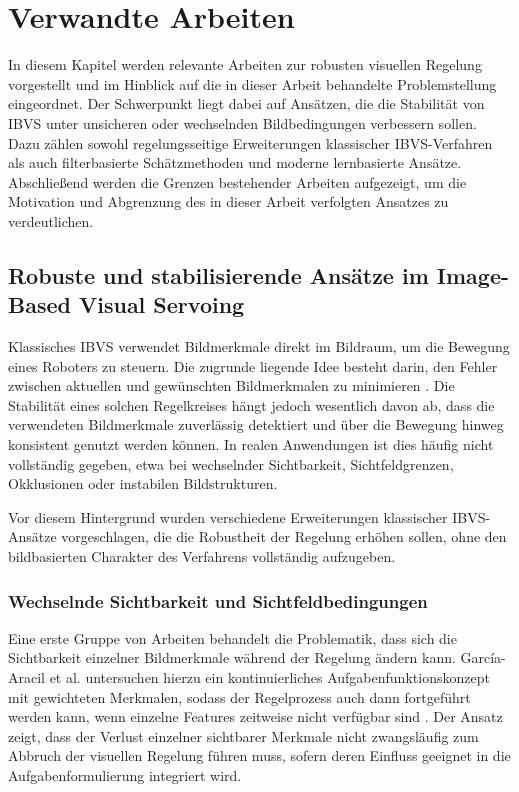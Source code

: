 \chapter{Verwandte Arbeiten}
\label{chap:verwandte_arbeiten}

In diesem Kapitel werden relevante Arbeiten zur robusten visuellen Regelung vorgestellt und im Hinblick auf die in dieser Arbeit behandelte Problemstellung eingeordnet. Der Schwerpunkt liegt dabei auf Ansätzen, die die Stabilität von \ac{IBVS} unter unsicheren oder wechselnden Bildbedingungen verbessern sollen. Dazu zählen sowohl regelungsseitige Erweiterungen klassischer \ac{IBVS}-Verfahren als auch filterbasierte Schätzmethoden und moderne lernbasierte Ansätze. Abschließend werden die Grenzen bestehender Arbeiten aufgezeigt, um die Motivation und Abgrenzung des in dieser Arbeit verfolgten Ansatzes zu verdeutlichen.

\section{Robuste und stabilisierende Ansätze im Image-Based Visual Servoing}
\label{sec:robust_ibvs_related}

Klassisches \ac{IBVS} verwendet Bildmerkmale direkt im Bildraum, um die Bewegung eines Roboters zu steuern. Die zugrunde liegende Idee besteht darin, den Fehler zwischen aktuellen und gewünschten Bildmerkmalen zu minimieren \cite{chaumette2006visual, chaumette2007visual2, hager1996tutorial}. Die Stabilität eines solchen Regelkreises hängt jedoch wesentlich davon ab, dass die verwendeten Bildmerkmale zuverlässig detektiert und über die Bewegung hinweg konsistent genutzt werden können. In realen Anwendungen ist dies häufig nicht vollständig gegeben, etwa bei wechselnder Sichtbarkeit, Sichtfeldgrenzen, Okklusionen oder instabilen Bildstrukturen.

Vor diesem Hintergrund wurden verschiedene Erweiterungen klassischer \ac{IBVS}-Ansätze vorgeschlagen, die die Robustheit der Regelung erhöhen sollen, ohne den bildbasierten Charakter des Verfahrens vollständig aufzugeben.

\subsection{Wechselnde Sichtbarkeit und Sichtfeldbedingungen}
\label{subsec:visibility_fov_related}

Eine erste Gruppe von Arbeiten behandelt die Problematik, dass sich die Sichtbarkeit einzelner Bildmerkmale während der Regelung ändern kann. García-Aracil et al. untersuchen hierzu ein kontinuierliches Aufgabenfunktionskonzept mit gewichteten Merkmalen, sodass der Regelprozess auch dann fortgeführt werden kann, wenn einzelne Features zeitweise nicht verfügbar sind \cite{garcia2005continuous}. Der Ansatz zeigt, dass der Verlust einzelner sichtbarer Merkmale nicht zwangsläufig zum Abbruch der visuellen Regelung führen muss, sofern deren Einfluss geeignet in die Aufgabenformulierung integriert wird.

